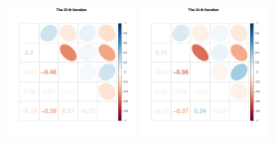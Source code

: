 \begin{figure}[h]
\includegraphics[width=0.3\textwidth,height=0.2\textheight]{Chapters/05MCMCOU/plots/paraEvolution/corMatrix23.pdf}
\includegraphics[width=0.3\textwidth,height=0.2\textheight]{Chapters/05MCMCOU/plots/paraEvolution/corMatrix24.pdf}
\end{figure}
